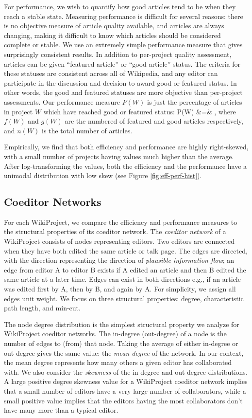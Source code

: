 For performance, we wish to quantify how good articles tend to be when they reach a stable state.
Measuring performance is difficult for several reasons:
there is no objective measure of article quality available,
and articles are always changing, making it difficult to know which articles should be considered
complete or stable.
We use an extremely simple performance measure that gives surprisingly consistent results.
In addition to per-project quality assessment, articles can be given ``featured article'' or
``good article'' status.
The criteria for these statuses are consistent across all of Wikipedia,
and any editor can participate in the discussion and decision to award good or featured
status.
In other words, the good and featured statuses are more objective than per-project assessments.
Our performance measure $P(W)$ is just the percentage of articles in project $W$ which have reached
good or featured status:
\beq
P(W) &=& ,
\eeq
where $f(W)$ and $g(W)$ are the numbered of featured and good articles respectively,
and $n(W)$ is the total number of articles.

Empirically, we find that both efficiency and performance are highly right-skewed,
with a small number of projects having values much higher than the average.
After log-transforming the values, both the efficiency and the performance have
a unimodal distribution with low skew (see Figure \ref{fig:eff-perf-hist}).

\subsection{Coeditor Networks}

For each WikiProject, we compare the efficiency and performance measures to the structural
properties of its coeditor network.
The {\em coeditor network} of a WikiProject consists of nodes representing editors.
Two editors are connected when they have both edited the same article or talk page.
The edges are directed, with the direction representing the direction of
{\em plausible information flow};
an edge from editor A to editor B exists if A edited an article and then B edited the same article at
a later time.
Edges can exist in both directions e.g., if an article was edited first by A, then by B, and again by A.
For simplicity, we assign all edges unit weight.
We focus on three structural properties: degree, characteristic path length, and min-cut.

The node degree distribution is the simplest structural property we analyze for WikiProject
coeditor networks.
The in-degree (out-degree) of a node is the number of edges to (from) that node.
Taking the average of either in-degree or out-degree gives the same value:
the {\em mean degree} of the network.
In our context, the mean degree represents how many others a given editor has collaborated with.
We also consider the {\em skewness} of the in-degree and out-degree distributions.
A large positive degree skewness value for a WikiProject coeditor network
implies that a small number of editors have a very large number of collaborators,
while a small positive value implies that the editors having the most collaborators
don't have many more than a typical editor.

